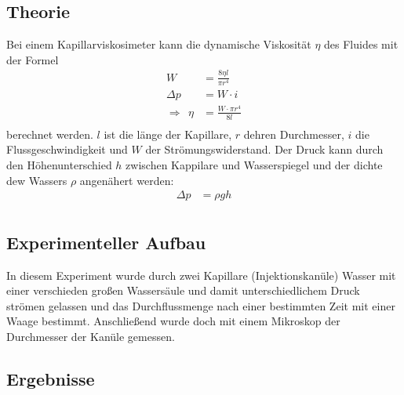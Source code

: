 \documentclass[11pt, a4paper]{article}
\begin{document}
    \subsection{Theorie}

    Bei einem Kapillarviskosimeter kann die dynamische Viskosität $\eta$ des Fluides mit der Formel
    \begin{align}
        W &= \frac{8 \eta l}{\pi r^4} \\
        \Delta p &= W \cdot i \\
        \Rightarrow \ \ \eta &= \frac{W \cdot \pi r^4}{8 l} \\
    \end{align}
    berechnet werden. $l$ ist die länge der Kapillare, $r$ dehren Durchmesser, $i$ die Flussgeschwindigkeit und $W$ der
    Strömungswiderstand. Der Druck kann durch den Höhenunterschied $h$ zwischen Kappilare und Wasserspiegel und der dichte dew Wassers $\rho$ angenähert werden:
    \begin{align}
        \Delta p &= \rho g h \\
    \end{align}

    \subsection{Experimenteller Aufbau}

    In diesem Experiment wurde durch zwei Kapillare (Injektionskanüle)
    Wasser mit einer verschieden großen Wassersäule und damit unterschiedlichem Druck strömen gelassen
    und das Durchflussmenge nach einer bestimmten Zeit mit einer Waage bestimmt. Anschließend wurde doch mit einem
    Mikroskop der Durchmesser der Kanüle gemessen.

    \subsection{Ergebnisse}
\end{document}
